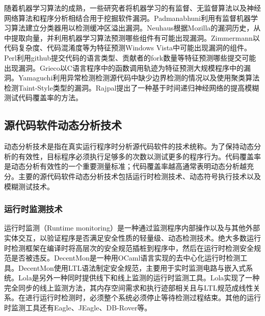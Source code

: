 随着机器学习算法的成熟，一些研究者将机器学习的有监督、无监督算法以及神经网络算法和程序分析相结合用于挖掘软件漏洞。Padmanabhuni利用有监督机器学习算法建立分类器用以检测缓冲区溢出漏洞。Neuhaus根据Mozilla的漏洞历史，从中提取向量，并利用机器学习算法预测哪些组件有可能出现漏洞。Zimmermann以代码复杂度、代码混淆度等为特征预测Windows Vista中可能出现漏洞的组件。Perl利用github提交代码的语言类型、贡献者的fork数量等特征预测哪些提交可能出现漏洞。Grieco以C语言程序中的函数调用轨迹为特征预测大规模程序中的漏洞。Yamaguchi利用异常检测检测源代码中缺少边界检测的情况以及使用聚类算法检测Taint-Style类型的漏洞。Rajpal提出了一种基于时间递归神经网络的提高模糊测试代码覆盖率的方法。


\subsection{源代码软件动态分析技术}

动态分析技术是指在真实运行程序时分析源代码软件的技术统称。为了保持动态分析的有效性，目标程序必须执行足够多的次数以测试更多的程序行为。代码覆盖率是动态分析有效性的一个重要测量标准；代码覆盖率越高通常表明动态分析越充分。主要的源代码软件动态分析技术包括运行时检测技术、动态符号执行技术以及模糊测试技术。


\subsubsection{运行时监测技术}

运行时监测（Runtime monitoring）是一种通过监测程序内部操作以及与其他外部实体交互，以验证程序是否满足安全性质的轻量级、动态检测技术。绝大多数运行时检测框架在编译时将高层次的安全规范插桩到程序中，然后在运行时检测安全规范是否被违反。DecentMon是一种用OCaml语言实现的去中心化运行时检测工具。DecentMon使用LTL语法制定安全规范，主要用于实时监测电路与嵌入式系统。Lola是另外一种同时提供线下和线上监测的运行时监测工具。Lola实现了一种完全同步的线上监测方法，其内存空间需求和执行迹部相关且与LTL规范成线性关系。在进行运行时检测时，必须整个系统必须停止等待检测过程结束。其他的运行时监测工具还有Eagle、JEagle、DB-Rover等。

